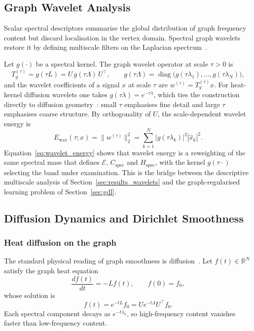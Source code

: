 \documentclass[11pt,reqno]{amsart}
\theoremstyle{plain}
\theoremstyle{definition}
\theoremstyle{remark}
\numberwithin{equation}{section}
\newcommand{\R}{\mathbb{R}}
\newcommand{\diag}{\operatorname{diag}}
\newcommand{\Cspec}{C_{\mathrm{spec}}}
\newcommand{\Hspec}{H_{\mathrm{spec}}}
\begin{document}
\subsection{Graph Wavelet Analysis}
\label{sec:wavelets}

Scalar spectral descriptors summarise the global distribution of graph frequency
content but discard localisation in the vertex domain. Spectral graph wavelets
restore it by defining multiscale filters on the Laplacian
spectrum~\cite{hammond2011wavelets,tremblay2014graph,shuman2016vertex}.

Let $g(\cdot)$ be a spectral kernel. The graph wavelet operator at scale
$\tau>0$ is~\cite{hammond2011wavelets}
\begin{equation}
T_{g}^{(\tau)} = g(\tau L) = U\,g(\tau\Lambda)\,U^{\top},
\qquad
g(\tau\Lambda) = \diag\!\big(g(\tau\lambda_1),\dots,g(\tau\lambda_N)\big),
\end{equation}
and the wavelet coefficients of a signal $x$ at scale $\tau$ are
$w^{(\tau)} = T_{g}^{(\tau)}x$. For heat-kernel diffusion wavelets one takes
$g(\tau\lambda)=e^{-\tau\lambda}$, which ties the construction directly to
diffusion geometry~\cite{coifman2006diffusion}: small $\tau$ emphasises fine
detail and large $\tau$ emphasises coarse structure. By orthogonality of $U$,
the scale-dependent wavelet energy is
\begin{equation}
\label{eq:wavelet_energy}
E_{\mathrm{wav}}(\tau;x) = \|w^{(\tau)}\|_2^2
= \sum_{k=1}^{N} |g(\tau\lambda_k)|^2 |\hat x_k|^2 .
\end{equation}
Equation~\eqref{eq:wavelet_energy} shows that wavelet energy is a reweighting of
the same spectral mass that defines $\mathcal{E}$, $\Cspec$ and $\Hspec$, with
the kernel $g(\tau\cdot)$ selecting the band under examination. This is the
bridge between the descriptive multiscale analysis of
Section~\ref{sec:results_wavelets} and the graph-regularised learning problem of
Section~\ref{sec:gdl}.

\subsection{Diffusion Dynamics and Dirichlet Smoothness}
\label{sec:diffusion}

\subsubsection{Heat diffusion on the graph}

The standard physical reading of graph smoothness is
diffusion~\cite{coifman2006diffusion}. Let $f(t)\in\R^{N}$ satisfy the graph
heat equation
\begin{equation}
\label{eq:heat_equation}
\frac{d f(t)}{dt} = -L f(t), \qquad f(0)=f_0 ,
\end{equation}
whose solution is
\begin{equation}
\label{eq:heat_solution}
f(t) = e^{-tL} f_0 = U e^{-t\Lambda} U^{\top} f_0 .
\end{equation}
Each spectral component decays as $e^{-t\lambda_k}$, so high-frequency content
vanishes faster than low-frequency content.
\end{document}
